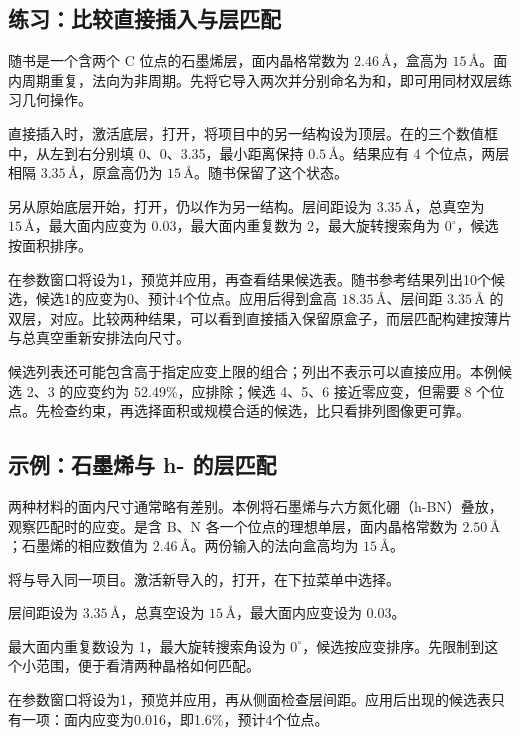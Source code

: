 \subsection{练习：比较直接插入与层匹配}

随书是一个含两个 C 位点的石墨烯层，面内晶格常数为 $2.46\,\text{\AA}$，盒高为 $15\,\text{\AA}$。面内周期重复，法向为非周期。先将它导入两次并分别命名为和，即可用同材双层练习几何操作。

直接插入时，激活底层，打开，将项目中的另一结构设为顶层。在的三个数值框中，从左到右分别填 0、0、3.35，最小距离保持 $0.5\,\text{\AA}$。结果应有 4 个位点，两层相隔 $3.35\,\text{\AA}$，原盒高仍为 $15\,\text{\AA}$。随书保留了这个状态。

另从原始底层开始，打开，仍以作为另一结构。层间距设为 $3.35\,\text{\AA}$，总真空为 $15\,\text{\AA}$，最大面内应变为 0.03，最大面内重复数为 2，最大旋转搜索角为 $0^\circ$，候选按面积排序。

在参数窗口将设为1，预览并应用，再查看结果候选表。随书参考结果列出10个候选，候选1的应变为0、预计4个位点。应用后得到盒高 $18.35\,\text{\AA}$、层间距 $3.35\,\text{\AA}$ 的双层，对应。比较两种结果，可以看到直接插入保留原盒子，而层匹配构建按薄片与总真空重新安排法向尺寸。

候选列表还可能包含高于指定应变上限的组合；列出不表示可以直接应用。本例候选 2、3 的应变约为 52.49\%，应排除；候选 4、5、6 接近零应变，但需要 8 个位点。先检查约束，再选择面积或规模合适的候选，比只看排列图像更可靠。

\subsection{示例：石墨烯与 h- 的层匹配}

两种材料的面内尺寸通常略有差别。本例将石墨烯与六方氮化硼（h-BN）叠放，观察匹配时的应变。是含 B、N 各一个位点的理想单层，面内晶格常数为 $2.50\,\text{\AA}$；石墨烯的相应数值为 $2.46\,\text{\AA}$。两份输入的法向盒高均为 $15\,\text{\AA}$。

\begin{steps}
  \item 将与导入同一项目。激活新导入的，打开，在下拉菜单中选择。
  \item 层间距设为 $3.35\,\text{\AA}$，总真空设为 $15\,\text{\AA}$，最大面内应变设为 0.03。
  \item 最大面内重复数设为 1，最大旋转搜索角设为 $0^\circ$，候选按应变排序。先限制到这个小范围，便于看清两种晶格如何匹配。
  \item 在参数窗口将设为1，预览并应用，再从侧面检查层间距。应用后出现的候选表只有一项：面内应变为0.016，即1.6\%，预计4个位点。
\end{steps}

